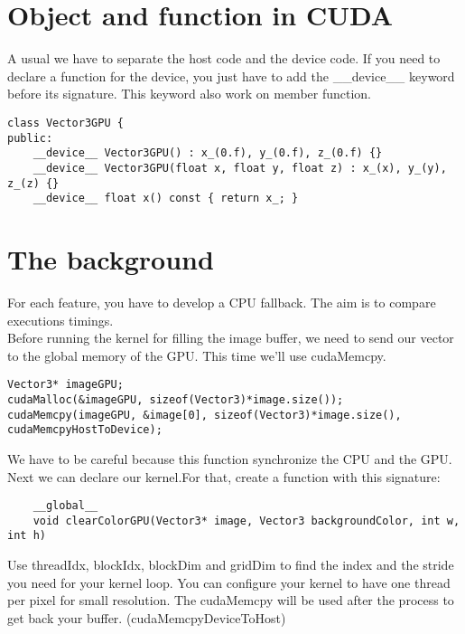 \documentclass{article}
\begin{document}
\section{Object and function in CUDA}
A usual we have to separate the host code and the device code. If you need to declare a function for the device, you just have to add the \_\_device\_\_ keyword before its signature. This keyword also work on member function.
\begin{lstlisting}
class Vector3GPU {
public:
	__device__ Vector3GPU() : x_(0.f), y_(0.f), z_(0.f) {}
	__device__ Vector3GPU(float x, float y, float z) : x_(x), y_(y), z_(z) {}
	__device__ float x() const { return x_; }
\end{lstlisting}

\section{The background}
For each feature, you have to develop a CPU fallback. The aim is to compare executions timings.\\
Before running the kernel for filling the image buffer, we need to send our vector to the global memory of the GPU. This time we'll use cudaMemcpy.
\begin{lstlisting}
Vector3* imageGPU;
cudaMalloc(&imageGPU, sizeof(Vector3)*image.size());
cudaMemcpy(imageGPU, &image[0], sizeof(Vector3)*image.size(), cudaMemcpyHostToDevice);
\end{lstlisting}
We have to be careful because this function synchronize the CPU and the GPU.\\
Next we can declare our kernel.For that, create a function with this signature:
\begin{lstlisting}
	__global__
	void clearColorGPU(Vector3* image, Vector3 backgroundColor, int w, int h)
\end{lstlisting}
Use threadIdx, blockIdx, blockDim and gridDim to find the index and the stride you need for your kernel loop. You can configure your kernel to have one thread per pixel for small resolution.
The cudaMemcpy will be used after the process to get back your buffer. (cudaMemcpyDeviceToHost)
\end{document}
